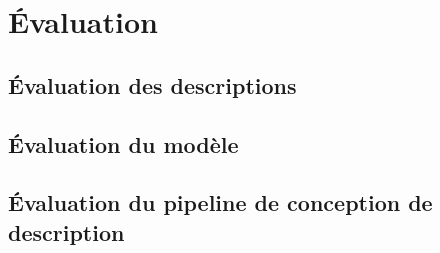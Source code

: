 \chapter{Évaluation}

\todo{}

\section{Évaluation des descriptions}

\todo{}

\section{Évaluation du modèle}

\todo{}

\section{Évaluation du pipeline de conception de description}

\todo{}